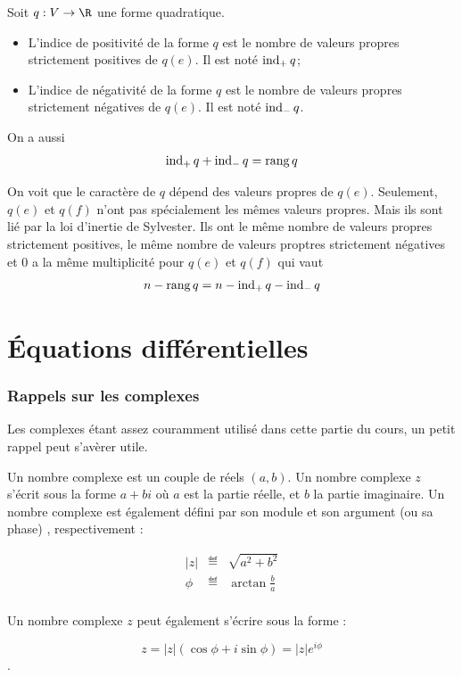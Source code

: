 \begin{myprop}
	Soit $q: V \to \R$ une forme quadratique.
	\begin{itemize}
		\item L'indice de positivité de la forme $q$ est le nombre de valeurs propres strictement positives de $q(e)$.
			Il est noté $\operatorname{ind}_+q$;
		\item L'indice de négativité de la forme $q$ est le nombre de valeurs propres strictement négatives de $q(e)$.
			Il est noté $\operatorname{ind}_-q$.
	\end{itemize}
	On a aussi
	\[ \operatorname{ind}_+q + \operatorname{ind}_-q = \operatorname{rang} q \]
\end{myprop}

\begin{myrem}
	On voit que le caractère de $q$ dépend des valeurs propres de $q(e)$.
	Seulement, $q(e)$ et $q(f)$ n'ont pas spécialement les mêmes valeurs propres.
	Mais ils sont lié par la loi d'inertie de Sylvester.
	Ils ont le même nombre de valeurs propres strictement positives,
	le même nombre de valeurs proptres strictement négatives
	et 0 a la même multiplicité pour $q(e)$ et $q(f)$ qui vaut
	\[ n - \operatorname{rang} q = n - \operatorname{ind}_+q - \operatorname{ind}_-q \]
\end{myrem}

\part{Équations différentielles}

\section{Rappels sur les complexes}
Les complexes étant assez couramment utilisé dans cette partie du cours, un petit rappel
peut s'avèrer utile. 

\begin{mydef}
	Un nombre complexe est un couple de réels $(a, b)$. Un nombre complexe $z$ s'écrit
	sous la forme $a+bi$ où $a$ est la partie réelle, et $b$ la partie imaginaire.
	Un nombre complexe est également défini par son module et son argument (ou sa phase)  
	, respectivement :
	
	\begin{eqnarray*}
		|z| & \eqdef & \sqrt{a^2 + b^2}\\
		\phi & \eqdef & \arctan \frac{b}{a}\\
	\end{eqnarray*}
	
	Un nombre complexe $z$ peut également s'écrire sous la forme : 
	
	$$z = |z|(\cos \phi + i \sin \phi) = |z|e^{i \phi}$$.
\end{mydef}

